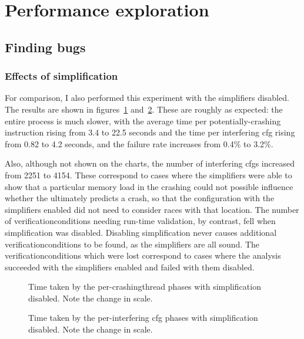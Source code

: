 \section{Performance exploration}
\label{sect:eval:time_details}

\subsection{Finding bugs}

\subsubsection{Effects of {\StateMachine} simplification}

For comparison, I also performed this experiment with the
{\StateMachine} simplifiers disabled.  The results are shown in
figures~\ref{fig:eval:time_breakdown:crashing_no_simple}
and~\ref{fig:eval:time_breakdown:interfering_no_simple}.  These are
roughly as expected: the entire process is much slower, with the
average time per potentially-crashing instruction rising from 3.4 to
22.5 seconds and the time per interfering \gls{cfg} rising from 0.82
to 4.2 seconds, and the failure rate increases from 0.4\% to 3.2\%.

Also, although not shown on the charts, the number of interfering
\glspl{cfg} increased from 2251 to 4154.  These correspond to cases
where the simplifiers were able to show that a particular memory load
in the crashing {\StateMachine} could not possible influence whether
the {\StateMachine} ultimately predicts a crash, so that the
configuration with the simplifiers enabled did not need to consider
races with that location.  The number of \glspl{verificationcondition}
needing run-time validation, by contrast, fell when simplification was
disabled.  Disabling simplification never causes additional
\glspl{verificationcondition} to be found, as the simplifiers are all
sound.  The \glspl{verificationcondition} which were lost correspond
to cases where the analysis succeeded with the simplifiers enabled and
failed with them disabled.

\begin{figure}
  \caption{Time taken by the per-\gls{crashingthread} phases with
    {\StateMachine} simplification disabled.  Note the change in
    scale.}
  \label{fig:eval:time_breakdown:crashing_no_simple}
\end{figure}

\begin{figure}
  \caption{Time taken by the per-interfering \gls{cfg} phases with
    {\StateMachine} simplification disabled.  Note the change in
    scale.}
  \label{fig:eval:time_breakdown:interfering_no_simple}
\end{figure}


